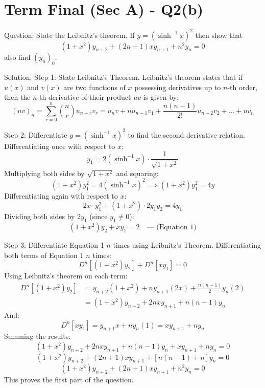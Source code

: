 \documentclass{article}
\begin{document}
\section*{Term Final (Sec A) - Q2(b)}
Question:
State the Leibnitz's theorem. If $y = (\sinh^{-1} x)^2$ then show that
\[
(1+x^2)y_{n+2} + (2n+1)xy_{n+1} + n^2 y_n = 0
\]
also find $(y_n)_0$.

Solution:
Step 1: State Leibnitz's Theorem.
Leibnitz's theorem states that if $u(x)$ and $v(x)$ are two functions of $x$ possessing derivatives up to $n$-th order, then the $n$-th derivative of their product $uv$ is given by:
\[
(uv)_n = \sum_{r=0}^n \binom{n}{r} u_{n-r} v_r = u_n v + n u_{n-1} v_1 + \frac{n(n-1)}{2!} u_{n-2} v_2 + \dots + u v_n
\]

Step 2: Differentiate $y = (\sinh^{-1} x)^2$ to find the second derivative relation.
Differentiating once with respect to $x$:
\[
y_1 = 2(\sinh^{-1} x) \cdot \frac{1}{\sqrt{1+x^2}}
\]
Multiplying both sides by $\sqrt{1+x^2}$ and squaring:
\[
(1+x^2) y_1^2 = 4(\sinh^{-1} x)^2 \implies (1+x^2) y_1^2 = 4y
\]
Differentiating again with respect to $x$:
\[
2x \cdot y_1^2 + (1+x^2) \cdot 2 y_1 y_2 = 4 y_1
\]
Dividing both sides by $2y_1$ (since $y_1 \ne 0$):
\[
(1+x^2)y_2 + x y_1 = 2 \quad \text{--- (Equation 1)}
\]

Step 3: Differentiate Equation 1 $n$ times using Leibnitz's Theorem.
Differentiating both terms of Equation 1 $n$ times:
\[
D^n\left[(1+x^2)y_2\right] + D^n[x y_1] = 0
\]
Using Leibnitz's theorem on each term:
\begin{align*}
    D^n\left[(1+x^2)y_2\right] &= y_{n+2} (1+x^2) + n y_{n+1} (2x) + \frac{n(n-1)}{2} y_n (2) \\
    &= (1+x^2)y_{n+2} + 2nx y_{n+1} + n(n-1)y_n
\end{align*}
And:
\[
D^n[x y_1] = y_{n+1} x + n y_n (1) = x y_{n+1} + n y_n
\]
Summing the results:
\[
(1+x^2)y_{n+2} + 2nx y_{n+1} + n(n-1)y_n + x y_{n+1} + n y_n = 0
\]
\[
(1+x^2)y_{n+2} + (2n+1)xy_{n+1} + [n(n-1)+n]y_n = 0
\]
\[
(1+x^2)y_{n+2} + (2n+1)xy_{n+1} + n^2 y_n = 0
\]
This proves the first part of the question.
\end{document}
